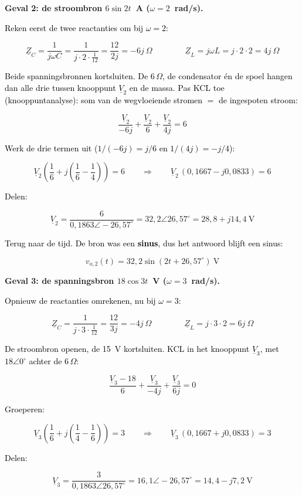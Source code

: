 \documentclass[a4paper,11pt]{article}
\newcommand{\stapreden}[1]{\par\vspace{1.4mm}\noindent\textcolor{black}{#1}\par\vspace{-2mm}}
\begin{document}
\begin{oefening}
    \textbf{Geval 2: de stroombron $6\sin 2t$~A ($\omega = 2$~rad/s).}

    \stapreden{Reken eerst de twee reactanties om bij $\omega = 2$:}
    \[\underline{Z}_C = \frac{1}{j\omega C} = \frac{1}{j\cdot 2\cdot \frac{1}{12}} = \frac{12}{2j} = -6j\ \Omega
        \qquad\qquad
        \underline{Z}_L = j\omega L = j\cdot 2\cdot 2 = 4j\ \Omega\]

    \stapreden{Beide spanningsbronnen kortsluiten. De $6\,\Omega$, de condensator \'en de spoel hangen dan alle drie tussen knooppunt $\underline{V}_2$ en de massa. Pas KCL toe (knooppuntanalyse): som van de wegvloeiende stromen $=$ de ingespoten stroom:}
    \[\frac{\underline{V}_2}{-6j} + \frac{\underline{V}_2}{6} + \frac{\underline{V}_2}{4j} = 6\]

    \stapreden{Werk de drie termen uit ($1/(-6j) = j/6$ en $1/(4j) = -j/4$):}
    \[\underline{V}_2\left(\frac{1}{6} + j\left(\frac{1}{6} - \frac{1}{4}\right)\right) = 6
        \qquad\Longrightarrow\qquad
        \underline{V}_2\,(0{,}1667 - j0{,}0833) = 6\]

    \stapreden{Delen:}
    \[\underline{V}_2 = \frac{6}{0{,}1863\angle -26{,}57^\circ} = 32{,}2\angle 26{,}57^\circ
        = 28{,}8 + j14{,}4\ \text{V}\]

    \stapreden{Terug naar de tijd. De bron was een \textbf{sinus}, dus het antwoord blijft een sinus:}
    \[v_{o,2}(t) = 32{,}2\sin(2t + 26{,}57^\circ)\ \text{V}\]

    \textbf{Geval 3: de spanningsbron $18\cos 3t$~V ($\omega = 3$~rad/s).}

    \stapreden{Opnieuw de reactanties omrekenen, nu bij $\omega = 3$:}
    \[\underline{Z}_C = \frac{1}{j\cdot 3\cdot\frac{1}{12}} = \frac{12}{3j} = -4j\ \Omega
        \qquad\qquad
        \underline{Z}_L = j\cdot 3\cdot 2 = 6j\ \Omega\]

    \stapreden{De stroombron openen, de 15~V kortsluiten. KCL in het knooppunt $\underline{V}_3$, met $18\angle 0^\circ$ achter de $6\,\Omega$:}
    \[\frac{\underline{V}_3 - 18}{6} + \frac{\underline{V}_3}{-4j} + \frac{\underline{V}_3}{6j} = 0\]

    \stapreden{Groeperen:}
    \[\underline{V}_3\left(\frac{1}{6} + j\left(\frac{1}{4} - \frac{1}{6}\right)\right) = 3
        \qquad\Longrightarrow\qquad
        \underline{V}_3\,(0{,}1667 + j0{,}0833) = 3\]

    \stapreden{Delen:}
    \[\underline{V}_3 = \frac{3}{0{,}1863\angle 26{,}57^\circ} = 16{,}1\angle -26{,}57^\circ
        = 14{,}4 - j7{,}2\ \text{V}\]


\end{oefening}
\end{document}
